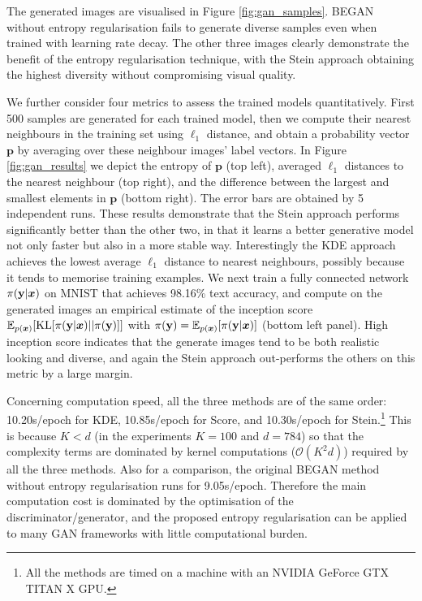 The generated images are visualised in Figure \ref{fig:gan_samples}. BEGAN without entropy regularisation fails to generate diverse samples even when trained with learning rate decay. The other three images clearly demonstrate the benefit of the entropy regularisation technique, with the Stein approach obtaining the highest diversity without compromising visual quality.

%
We further consider four metrics to assess the trained models quantitatively. First 500 samples are generated for each trained model, then we compute their nearest neighbours in the training set using $\ell_1$ distance, and obtain a probability vector $\mathbf{p}$ by averaging over these neighbour images' label vectors. In Figure \ref{fig:gan_results} we depict the entropy of $\mathbf{p}$  (top left), averaged $\ell_1$ distances to the nearest neighbour (top right), and the difference between the largest and smallest elements in $\mathbf{p}$ (bottom right). The error bars are obtained by 5 independent runs. These results demonstrate that the Stein approach performs significantly better than the other two, in that  it learns a better generative model not only faster but also in a more stable way. Interestingly the KDE approach achieves the lowest average $\ell_1$ distance to nearest neighbours, possibly because it tends to memorise training examples. We next train a fully connected network $\pi(\mathbf{y}|\bm{x})$ on MNIST that achieves 98.16\% text accuracy, and compute on the generated images an empirical estimate of the inception score \citep{salimans:training2016} $\mathbb{E}_{p(\bm{x})}[\mathrm{KL}[\pi(\mathbf{y}|\bm{x}) || \pi(\mathbf{y})] ]$ with $\pi(\mathbf{y}) = \mathbb{E}_{p(\bm{x})}[\pi(\mathbf{y}|\bm{x})]$ (bottom left panel). High inception score indicates that the generate images tend to be both realistic looking and diverse, and again the Stein approach out-performs the others on this metric by a large margin. 

Concerning computation speed, all the three methods are of the same order: 10.20s/epoch for KDE, 10.85s/epoch for Score, and 10.30s/epoch for Stein.\footnote{All the methods are timed on a machine with an NVIDIA GeForce GTX TITAN X GPU.} This is because $K < d$ (in the experiments $K=100$ and $d=784$) so that the complexity terms are dominated by kernel computations ($\mathcal{O}(K^2 d)$) required by all the three methods. Also for a comparison, the original BEGAN method without entropy regularisation runs for 9.05s/epoch. Therefore the main computation cost is dominated by the optimisation of the discriminator/generator, and the proposed entropy regularisation can be applied to many GAN frameworks with little computational burden.

